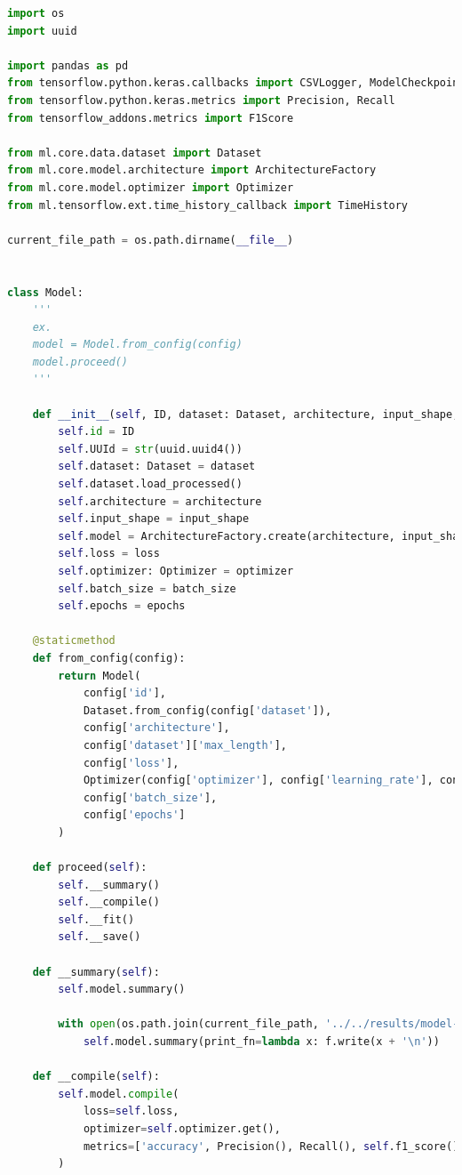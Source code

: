 \documentclass{article}
\begin{document}
\begin{lstlisting}[language=Python, caption=ml.core.model.model]
import os
import uuid

import pandas as pd
from tensorflow.python.keras.callbacks import CSVLogger, ModelCheckpoint
from tensorflow.python.keras.metrics import Precision, Recall
from tensorflow_addons.metrics import F1Score

from ml.core.data.dataset import Dataset
from ml.core.model.architecture import ArchitectureFactory
from ml.core.model.optimizer import Optimizer
from ml.tensorflow.ext.time_history_callback import TimeHistory

current_file_path = os.path.dirname(__file__)


class Model:
    '''
    ex.
    model = Model.from_config(config)
    model.proceed()
    '''

    def __init__(self, ID, dataset: Dataset, architecture, input_shape, loss, optimizer: Optimizer, batch_size, epochs):
        self.id = ID
        self.UUId = str(uuid.uuid4())
        self.dataset: Dataset = dataset
        self.dataset.load_processed()
        self.architecture = architecture
        self.input_shape = input_shape
        self.model = ArchitectureFactory.create(architecture, input_shape, self.dataset.embedding)
        self.loss = loss
        self.optimizer: Optimizer = optimizer
        self.batch_size = batch_size
        self.epochs = epochs

    @staticmethod
    def from_config(config):
        return Model(
            config['id'],
            Dataset.from_config(config['dataset']),
            config['architecture'],
            config['dataset']['max_length'],
            config['loss'],
            Optimizer(config['optimizer'], config['learning_rate'], config['decay']),
            config['batch_size'],
            config['epochs']
        )

    def proceed(self):
        self.__summary()
        self.__compile()
        self.__fit()
        self.__save()

    def __summary(self):
        self.model.summary()

        with open(os.path.join(current_file_path, '../../results/model-summary/model-' + self.UUId), 'w') as f:
            self.model.summary(print_fn=lambda x: f.write(x + '\n'))

    def __compile(self):
        self.model.compile(
            loss=self.loss,
            optimizer=self.optimizer.get(),
            metrics=['accuracy', Precision(), Recall(), self.f1_score()]
        )


\end{lstlisting}
\end{document}
